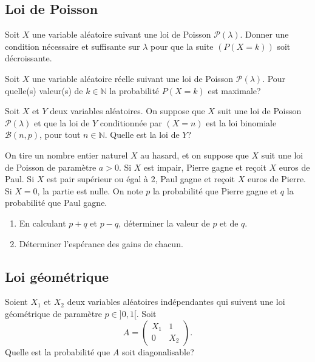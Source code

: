 \documentclass{book}
\begin{document}

\subsection*{Loi de Poisson}
\begin{Exercice}
Soit $X$ une variable aléatoire suivant une loi de Poisson $\mathcal P(\lambda)$. Donner une condition nécessaire et suffisante sur $\lambda$ pour que la suite $(P(X=k))$ soit décroissante.
\end{Exercice}

\begin{Exercice}
Soit $X$ une variable aléatoire réelle suivant une loi de Poisson $\mathcal P(\lambda)$.
Pour quelle(s) valeur(s) de $k\in\mathbb N$ la probabilité $P(X=k)$ est maximale?
\end{Exercice}

\begin{Exercice}
Soit $X$ et $Y$ deux variables aléatoires. On suppose que $X$ suit une loi de Poisson $\mathcal P(\lambda)$ et que la loi de $Y$ conditionnée par $(X=n)$ est la loi binomiale $\mathcal B(n,p)$, pour tout $n\in\mathbb N$. Quelle est la loi de $Y$?
\end{Exercice}

\begin{Exercice}
On tire un nombre entier naturel $X$ au hasard, et on suppose que $X$ suit une loi de Poisson de paramètre $a>0$. Si $X$ est impair, Pierre gagne et reçoit $X$ euros de Paul. Si $X$ est pair supérieur ou égal à 2, Paul gagne et reçoit $X$ euros de Pierre. Si $X=0$, la partie est nulle.
On note $p$ la probabilité que Pierre gagne et $q$ la probabilité que Paul gagne.
\begin{enumerate}
\item En calculant $p+q$ et $p-q$, déterminer la valeur de $p$ et de $q$.
\item Déterminer l'espérance des gains de chacun.
\end{enumerate}
\end{Exercice}


\subsection*{Loi géométrique}
\begin{Exercice}[Diagonalisable ?]
Soient $X_1$ et $X_2$ deux variables aléatoires indépendantes qui suivent une loi géométrique de paramètre $p\in ]0,1[$. Soit 
$$A=\left(\begin{array}{cc} X_1&1\\0&X_2\end{array}\right).$$
Quelle est la probabilité que $A$ soit diagonalisable?
\end{Exercice}
\end{document}
